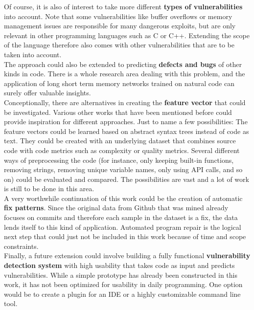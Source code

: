 \documentclass[
a4paper,
pagesize,
pdftex,
12pt,
twoside, %
BCOR=5mm, %
ngerman,
fleqn,
final,
]{scrartcl}
\begin{document}
	Of course, it is also of interest to take more different \textbf{types of vulnerabilities} into account. Note that some vulnerabilities like buffer overflows or memory management issues are responsible for many dangerous exploits, but are only relevant in other programming languages such as C or C++. Extending the scope of the language therefore also comes with other vulnerabilities that are to be taken into account.\\
	The approach could also be extended to predicting \textbf{defects and bugs} of other kinds in code. There is a whole research area dealing with this problem, and the application of long short term memory networks trained on natural code can surely offer valuable insights.\\
	Conceptionally, there are alternatives in creating the \textbf{feature vector} that could be investigated. Various other works that have been mentioned before could provide inspiration for different approaches. Just to name a few possibilities: The feature vectors could be learned based on abstract syntax trees instead of code as text. They could be created with an underlying dataset that combines source code with code metrics such as complexity or quality metrics. Several different ways of preprocessing the code (for instance, only keeping built-in functions, removing strings, removing unique variable names, only using API calls, and so on) could be evaluated and compared. The possibilities are vast and a lot of work is still to be done in this area.\\
	A very worthwhile continuation of this work could be the creation of automatic \textbf{fix patterns}. Since the original data from Github that was mined already focuses on commits and therefore each sample in the dataset is a fix, the data lends itself to this kind of application. Automated program repair is the logical next step that could just not be included in this work because of time and scope constraints.\\
	Finally, a future extension could involve building a fully functional \textbf{vulnerability detection system} with high usability that takes code as input and predicts vulnerabilities. While a simple prototype has already been constructed in this work, it has not been optimized for usability in daily programming. One option would be to create a plugin for an IDE or a highly customizable command line tool.
	
	
	
	
	
\end{document}
